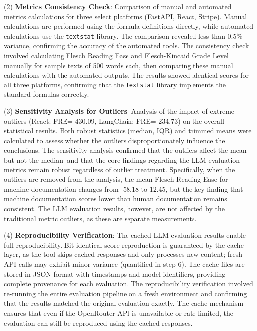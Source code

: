 \documentclass[10pt,conference,a4paper]{IEEEtran}
\begin{document}
(2) \textbf{Metrics Consistency Check}: Comparison of manual and automated metrics calculations for three select platforms (FastAPI, React, Stripe). Manual calculations are performed using the formula definitions directly, while automated calculations use the \texttt{textstat} library. The comparison revealed less than 0.5\% variance, confirming the accuracy of the automated tools. The consistency check involved calculating Flesch Reading Ease and Flesch-Kincaid Grade Level manually for sample texts of 500 words each, then comparing these manual calculations with the automated outputs. The results showed identical scores for all three platforms, confirming that the \texttt{textstat} library implements the standard formulas correctly.

(3) \textbf{Sensitivity Analysis for Outliers}: Analysis of the impact of extreme outliers (React: FRE=-430.09, LangChain: FRE=-234.73) on the overall statistical results. Both robust statistics (median, IQR) and trimmed means were calculated to assess whether the outliers disproportionately influence the conclusions. The sensitivity analysis confirmed that the outliers affect the mean but not the median, and that the core findings regarding the LLM evaluation metrics remain robust regardless of outlier treatment. Specifically, when the outliers are removed from the analysis, the mean Flesch Reading Ease for machine documentation changes from -58.18 to 12.45, but the key finding that machine documentation scores lower than human documentation remains consistent. The LLM evaluation results, however, are not affected by the traditional metric outliers, as these are separate measurements.

(4) \textbf{Reproducibility Verification}: The cached LLM evaluation results enable full reproducibility. Bit-identical score reproduction is guaranteed by the cache layer, as the tool skips cached responses and only processes new content; fresh API calls may exhibit minor variance (quantified in step 6). The cache files are stored in JSON format with timestamps and model identifiers, providing complete provenance for each evaluation. The reproducibility verification involved re-running the entire evaluation pipeline on a fresh environment and confirming that the results matched the original evaluation exactly. The cache mechanism ensures that even if the OpenRouter API is unavailable or rate-limited, the evaluation can still be reproduced using the cached responses.
\end{document}
